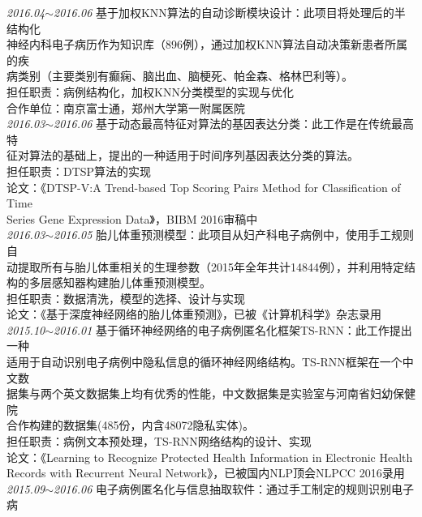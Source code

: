 \documentclass[line, margin]{res}
\newcommand{\xiaowu}{\fontsize{9pt}{15.75pt}\selectfont} %
\begin{document}
\begin{resume}
 { 
 {\sl 2016.04$\sim$2016.06} 基于加权KNN算法的自动诊断模块设计：{ 此项目将处理后的半结构化\\
 神经内科电子病历作为知识库（896例），通过加权KNN算法自动决策新患者所属的疾\\
 病类别（主要类别有癫痫、脑出血、脑梗死、帕金森、格林巴利等）。\\
 {\xiaowu 担任职责：病例结构化，加权KNN分类模型的实现与优化}\\
 {\xiaowu 合作单位：南京富士通，郑州大学第一附属医院} }\\
[9pt] 
 {\sl 2016.03$\sim$2016.06} 基于动态最高特征对算法的基因表达分类：{ 此工作是在传统最高特\\
 征对算法的基础上，提出的一种适用于时间序列基因表达分类的算法。}\\
 {\xiaowu 担任职责：DTSP算法的实现}\\
 {\xiaowu 论文：《DTSP-V:A Trend-based Top Scoring Pairs Method for Classification of Time\\
  Series Gene Expression Data》，BIBM 2016审稿中}\\
[9pt] 
 {\sl 2016.03$\sim$2016.05} 胎儿体重预测模型：{ 此项目从妇产科电子病例中，使用手工规则自\\
 动提取所有与胎儿体重相关的生理参数（2015年全年共计14844例），并利用特定结\\
 构的多层感知器构建胎儿体重预测模型。} \\
 {\xiaowu 担任职责：数据清洗，模型的选择、设计与实现}\\
 {\xiaowu 论文：《基于深度神经网络的胎儿体重预测》，已被《计算机科学》杂志录用} \\
[9pt]
 {\sl 2015.10$\sim$2016.01} 基于循环神经网络的电子病例匿名化框架TS-RNN：{ 此工作提出一种\\
 适用于自动识别电子病例中隐私信息的循环神经网络结构。TS-RNN框架在一个中文数\\
 据集与两个英文数据集上均有优秀的性能，中文数据集是实验室与河南省妇幼保健院\\
 合作构建的数据集(485份，内含48072隐私实体)。} \\
 {\xiaowu 担任职责：病例文本预处理，TS-RNN网络结构的设计、实现}\\
 {\xiaowu 论文：《Learning to Recognize Protected Health Information in  Electronic Health\\
 Records with Recurrent Neural Network》，已被国内NLP顶会NLPCC 2016录用}\\
[9pt] 
 {\sl 2015.09$\sim$2016.06} 电子病例匿名化与信息抽取软件：{ 通过手工制定的规则识别电子病\\
}}
\end{resume}
\end{document}
